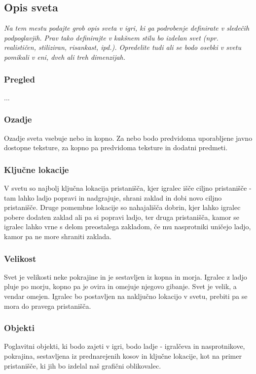 \documentclass[a4paper]{article}
\begin{document}
\subsection{Opis sveta}
\textit{Na tem mestu podajte grob opis sveta v igri, ki ga podrobenje definirate v sledečih podpoglavjih. Prav tako definirajte v kakšnem stilu bo izdelan svet (npr. realističen, stiliziran, risankast, ipd.). Opredelite tudi ali se bodo osebki v svetu pomikali v eni, dveh ali treh dimenzijah.\\
}
\subsubsection{Pregled}
...

\subsubsection{Ozadje}
Ozadje sveta vsebuje nebo in kopno. Za nebo bodo predvidoma uporabljene javno dostopne teksture, za kopno pa predvidoma teksture in dodatni predmeti.

\subsubsection{Ključne lokacije}
V svetu so najbolj ključna lokacija pristanišča, kjer igralec išče ciljno pristanišče - tam lahko ladjo popravi in nadgrajuje, shrani zaklad in dobi novo ciljno pristanišče. Druge pomembne lokacije so nahajališča dobrin, kjer lahko igralec pobere dodaten zaklad ali pa si popravi ladjo, ter druga pristanišča, kamor se igralec lahko vrne s delom preostalega zakladom, če mu nasprotniki uničejo ladjo, kamor pa ne more shraniti zaklada.

\subsubsection{Velikost}
Svet je velikosti neke pokrajine in je sestavljen iz kopna in morja. Igralec z ladjo pluje po morju, kopno pa je ovira in omejuje njegovo gibanje. Svet je velik, a vendar omejen. Igralec bo postavljen na naključno lokacijo v svetu, prebiti pa se mora do pravega pristanišča. 

\subsubsection{Objekti}
Poglavitni objekti, ki bodo zajeti v igri, bodo ladje - igralčeva in nasprotnikove, pokrajina, sestavljena iz prednarejenih kosov in ključne lokacije, kot na primer pristanišče, ki jih bo izdelal naš grafični oblikovalec.
\end{document}
